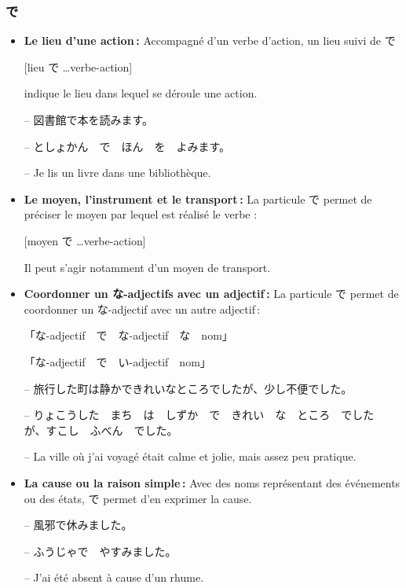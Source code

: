         \subsubsection{で}

    \begin{itemize}
        \item \textbf{Le lieu d'une action :} Accompagné d'un verbe d'action, un lieu suivi de で
        \begin{center}
            [lieu で \dots verbe-action]
        \end{center}
        indique le lieu dans lequel se déroule une action.
        \begin{tcolorbox}
            -- 図書館で本を読みます。

            -- としょかん　で　ほん　を　よみます。

            -- Je lis un livre dans une bibliothèque.
        \end{tcolorbox}

        \item \textbf{Le moyen, l'instrument et le transport :} La particule で permet de préciser le moyen par lequel est réalisé le verbe :
        \begin{center}
            [moyen で \dots verbe-action]
        \end{center}
        Il peut s'agir notamment d'un moyen de transport.

        \item \textbf{Coordonner un な-adjectifs avec un adjectif :} La particule で permet de coordonner un な-adjectif avec un autre adjectif :
        
        \begin{center}
            「な-adjectif　で　な-adjectif　な　nom」

            「な-adjectif　で　い-adjectif　nom」
        \end{center}

        \begin{tcolorbox}
            -- 旅行した町は静かできれいなところでしたが、少し不便でした。

            -- りょこうした　まち　は　しずか　で　きれい　な　ところ　でした　が、すこし　ふべん　でした。

            -- La ville où j'ai voyagé était calme et jolie, mais assez peu pratique.
        \end{tcolorbox}

        \item \textbf{La cause ou la raison simple :} Avec des noms représentant des événements ou des états, で permet d'en exprimer la cause.
        
        \begin{tcolorbox}
            -- 風邪で休みました。

            -- ふうじゃで　やすみました。

            -- J'ai été absent à cause d'un rhume.
        \end{tcolorbox}
    \end{itemize}

